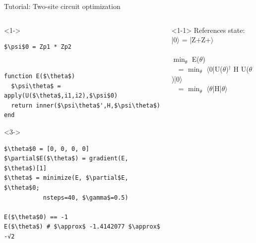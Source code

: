\begin{frame}[fragile]{Tutorial: Two-site circuit optimization}

\begin{columns}

\begin{column}{5cm}

\begin{onlyenv}<1->
\begin{lstlisting}[language=JuliaLocal, style=julia, mathescape, basicstyle=\scriptsize\ttfamily]
$\psi$0 = Zp1 * Zp2


function E($\theta$)
  $\psi\theta$ = apply(U($\theta$,i1,i2),$\psi$0)
  return inner($\psi\theta$',H,$\psi\theta$)
end
\end{lstlisting}
\end{onlyenv}

\begin{onlyenv}<3->
\begin{lstlisting}[language=JuliaLocal, style=julia, mathescape, basicstyle=\scriptsize\ttfamily]
$\theta$0 = [0, 0, 0, 0]
$\partial$E($\theta$) = gradient(E, $\theta$)[1]
$\theta$ = minimize(E, $\partial$E, $\theta$0;
           nsteps=40, $\gamma$=0.5)

E($\theta$0) == -1
E($\theta$) # $\approx$ -1.4142077 $\approx$ -√2
\end{lstlisting}
\end{onlyenv}

\end{column}

\begin{column}{5cm}

\begin{onlyenv}<1-1>
References state: \\
|0$\rangle$ = |Z+Z+$\rangle$ \\
~\\
$\min_{\theta}$ E($\theta$)\\
\ \ = $\min_{\theta}$ $\langle$0|U($\theta$)$^\dagger$ H U($\theta$)|0$\rangle$ \\
\ \ = $\min_{\theta}$ $\langle\theta$|H|$\theta\rangle$ \\
\end{onlyenv}


\end{column}
\end{columns}
\end{frame}

